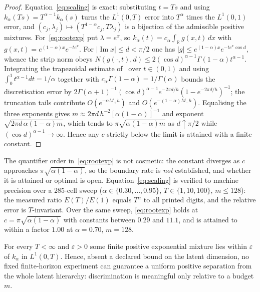 \begin{proof}
Equation~\eqref{eq:scaling} is exact: substituting $t=Ts$ and using $k_\alpha(Ts)=T^{\alpha-1}k_\alpha(s)$ turns the $L^1(0,T)$ error into $T^\alpha$ times the $L^1(0,1)$ error, and $(c_j,\lambda_j)\mapsto(T^{1-\alpha}c_j,T\lambda_j)$ is a bijection of the admissible positive mixtures. For~\eqref{eq:rootexp} put $\lambda=e^x$, so $k_\alpha(t)=c_\alpha\int_{\mathbb R}g(x,t)\,dx$ with $g(x,t)=e^{(1-\alpha)x}e^{-te^x}$. For $|\operatorname{Im}x|\le d<\pi/2$ one has $|g|\le e^{(1-\alpha)x}e^{-te^x\cos d}$, whence the strip norm obeys $N(g(\cdot,t),d)\le2(\cos d)^{\alpha-1}\Gamma(1-\alpha)t^{\alpha-1}$. Integrating the trapezoidal estimate of~\cite{K08} over $t\in(0,1)$ and using $\int_0^1t^{\alpha-1}dt=1/\alpha$ together with $c_\alpha\Gamma(1-\alpha)=1/\Gamma(\alpha)$ bounds the discretisation error by $2\Gamma(\alpha+1)^{-1}(\cos d)^{\alpha-1}e^{-2\pi d/h}(1-e^{-2\pi d/h})^{-1}$; the truncation tails contribute $O(e^{-\alpha M_+h})$ and $O(e^{-(1-\alpha)M_-h})$. Equalising the three exponents gives $m\approx2\pi d\,h^{-2}[\alpha(1-\alpha)]^{-1}$ and exponent $\sqrt{2\pi d\,\alpha(1-\alpha)m}$, which tends to $\pi\sqrt{\alpha(1-\alpha)m}$ as $d\uparrow\pi/2$ while $(\cos d)^{\alpha-1}\to\infty$. Hence any $c$ strictly below the limit is attained with a finite constant.
\end{proof}

The quantifier order in~\eqref{eq:rootexp} is not cosmetic: the constant diverges as $c$ approaches $\pi\sqrt{\alpha(1-\alpha)}$, so the boundary rate is \emph{not} established, and whether it is attained or optimal is open. Equation~\eqref{eq:scaling} is verified to machine precision over a 285-cell sweep ($\alpha\in\{0.30,\dots,0.95\}$, $T\in\{1,10,100\}$, $m\le128$): the measured ratio $E(T)/E(1)$ equals $T^\alpha$ to all printed digits, and the relative error is $T$-invariant. Over the same sweep, \eqref{eq:rootexp} holds at $c=\pi\sqrt{\alpha(1-\alpha)}$ with constants between $0.29$ and $11.1$, and is attained to within a factor $1.00$ at $\alpha=0.70$, $m=128$.

\begin{corollary}
\label{cor:closure}
For every $T<\infty$ and $\varepsilon>0$ some finite positive exponential mixture lies within $\varepsilon$ of $k_\alpha$ in $L^1(0,T)$. Hence, absent a declared bound on the latent dimension, no fixed finite-horizon experiment can guarantee a uniform positive separation from the whole latent hierarchy: discrimination is meaningful only relative to a budget $m$.
\end{corollary}


